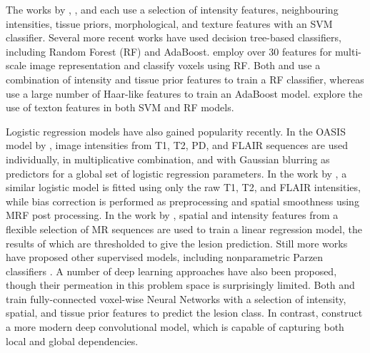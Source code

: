 The works by \citeauthor{Lao2006} \cite{Lao2006}, \citeauthor{Abdullah2012} \cite{Abdullah2012}, and \citeauthor{Scully2010} \cite{Scully2010} each use a selection of intensity features, neighbouring intensities, tissue priors, morphological, and texture features with an SVM classifier.
Several more recent works have used decision tree-based classifiers, including Random Forest (RF) and AdaBoost.
\citeauthor{Akselrod-Ballin2009} \cite{Akselrod-Ballin2009} employ over 30 features for multi-scale image representation and classify voxels using RF.
Both \citeauthor{Geremia2011} \cite{Geremia2011} and \citeauthor{Roy2015} \cite{Roy2015} use a combination of intensity and tissue prior features to train a RF classifier, whereas \citeauthor{Wels2008} \cite{Wels2008} use a large number of Haar-like features to train an AdaBoost model.
\citeauthor{Ithapu2014} \cite{Ithapu2014} explore the use of texton features in both SVM and RF models.
\par
Logistic regression models have also gained popularity recently.
In the OASIS model by \citeauthor{Sweeney2013} \cite{Sweeney2013}, image intensities from T1, T2, PD, and FLAIR sequences are used individually, in multiplicative combination, and with Gaussian blurring as predictors for a global set of logistic regression parameters.
In the work by \citeauthor{Zhan2017} \cite{Zhan2017}, a similar logistic model is fitted using only the raw T1, T2, and FLAIR intensities, while bias correction is performed as preprocessing and spatial smoothness using MRF post processing.
In the work by \citeauthor{Dadar2017} \cite{Dadar2017}, spatial and intensity features from a flexible selection of MR sequences are used to train a linear regression model, the results of which are thresholded to give the lesion prediction.
Still more works have proposed other supervised models, including nonparametric Parzen classifiers \cite{Sajja2006}.
A number of deep learning approaches have also been proposed, though their permeation in this problem space is surprisingly limited.
Both \citeauthor{Zijdenbos2002} \cite{Zijdenbos2002} and \citeauthor{Dyrby2008} \cite{Dyrby2008} train fully-connected voxel-wise Neural Networks with a selection of intensity, spatial, and tissue prior features to predict the lesion class.
In contrast, \citeauthor{Brosch2015} \cite{Brosch2015} construct a more modern deep convolutional model, which is capable of capturing both local and global dependencies.

